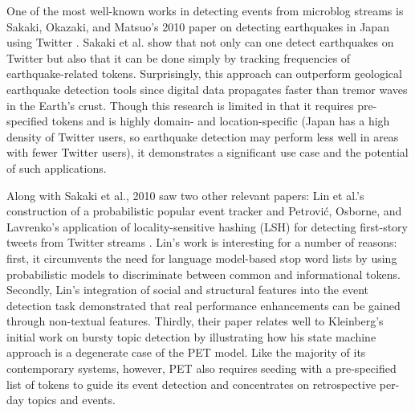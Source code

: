 \documentclass{sig-alternate}
\begin{document}
One of the most well-known works in detecting events from microblog streams is Sakaki, Okazaki, and Matsuo's 2010 paper on detecting earthquakes in Japan using Twitter \cite{Sakaki:2010:EST:1772690.1772777}.
Sakaki et al. show that not only can one detect earthquakes on Twitter but also that it can be done simply by tracking frequencies of earthquake-related tokens.
Surprisingly, this approach can outperform geological earthquake detection tools since digital data propagates faster than tremor waves in the Earth's crust.
Though this research is limited in that it requires pre-specified tokens and is highly domain- and location-specific (Japan has a high density of Twitter users, so earthquake detection may perform less well in areas with fewer Twitter users), it demonstrates a significant use case and the potential of such applications.

Along with Sakaki et al., 2010 saw two other relevant papers: Lin et al.'s construction of a probabilistic popular event tracker \cite{Lin:2010:PSM:1835804.1835922} and Petrovi\'{c}, Osborne, and Lavrenko's application of locality-sensitive hashing (LSH) for detecting first-story tweets from Twitter streams \cite{Petrovic:2010:SFS:1857999.1858020}.
Lin's work is interesting for a number of reasons: first, it circumvents the need for language model-based stop word lists by using probabilistic models to discriminate between common and informational tokens.
Secondly, Lin's integration of social and structural features into the event detection task demonstrated that real performance enhancements can be gained through non-textual features.
Thirdly, their paper relates well to Kleinberg's initial work on bursty topic detection by illustrating how his state machine approach is a degenerate case of the PET model.
Like the majority of its contemporary systems, however, PET also requires seeding with a pre-specified list of tokens to guide its event detection and concentrates on retrospective per-day topics and events.
\end{document}
